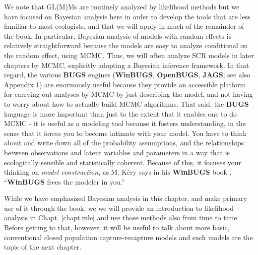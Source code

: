 We note that GL(M)Ms are routinely
analyzed by likelihood methods but we have focused on Bayesian
analysis here in order to develop the tools that are less familiar to
most ecologists, and that we will apply in much of the remainder of the book.  In particular, Bayesian analysis of models with random
effects is relatively straightforward because the models
are easy to analyze conditional on the random effect, using 
MCMC.  Thus, we will often analyze SCR models in later chapters by
MCMC, explicitly adopting a Bayesian inference framework.
In that regard, the various {\bf BUGS} engines ({\bf WinBUGS}, {\bf
  OpenBUGS}, {\bf JAGS}; see also Appendix 1) are enormously useful because they
provide an accessible platform for
carrying out  analyses by MCMC by just
describing the model, and not having to worry about how to actually
build MCMC algorithms.  That said, the {\bf BUGS} language is more important
than just to the extent that it enables one to do MCMC - it is useful
as a modeling tool because it fosters understanding, in the sense that
it forces you to become intimate with your model. You have to think
about and write
down all of the probability assumptions, and the relationships between
observations and latent variables and parameters in a way that is
ecologically sensible and statistically coherent. Because of this,
it focuses your thinking on {\it model construction}, 
as M. K\'{e}ry says
in his {\bf WinBUGS} book \citep{kery:2010}, ``{\bf WinBUGS}   frees
the modeler in you.''


While we have emphasized Bayesian analysis in this chapter, and make
primary use of it through the book, we
we will provide an introduction to likelihood analysis in Chapt.
\ref{chapt.mle} and use those  methods also from time to time.
 Before getting to that, however, it will be useful to
talk about more basic, conventional closed population
capture-recapture models and such models are the topic of the next chapter.
